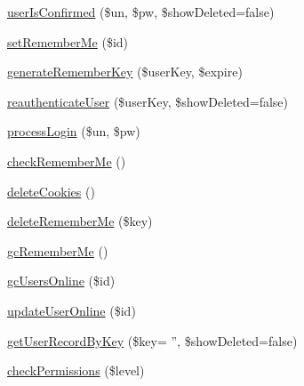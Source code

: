\begin{DoxyCompactItemize}
\item 
\hyperlink{classauth_a993edc9ce2684d94413789e743699f69}{user\-Is\-Confirmed} (\$un, \$pw, \$show\-Deleted=false)
\item 
\hyperlink{classauth_af52cf47d75b041a556ba0e81deb360b9}{set\-Remember\-Me} (\$id)
\item 
\hyperlink{classauth_a09c027ddb57e88464c0c299bcec2bbe9}{generate\-Remember\-Key} (\$user\-Key, \$expire)
\item 
\hyperlink{classauth_aad6c1472b13774bc969706be59e18e76}{reauthenticate\-User} (\$user\-Key, \$show\-Deleted=false)
\item 
\hyperlink{classauth_aba494ca171bd656b333cbb9ea412b05e}{process\-Login} (\$un, \$pw)
\item 
\hyperlink{classauth_a99dff94a4c66e53cb8aef3e5968a364f}{check\-Remember\-Me} ()
\item 
\hyperlink{classauth_a329bef105cd79e4930ce041851c46f8b}{delete\-Cookies} ()
\item 
\hyperlink{classauth_aa951d8fc2e1b0e0d399029c41c931a8f}{delete\-Remember\-Me} (\$key)
\item 
\hyperlink{classauth_afbd47d6b338ab27fb1fcc8adc53ddac0}{gc\-Remember\-Me} ()
\item 
\hyperlink{classauth_a3f53c431d5b15d03c6af6260b7ac8277}{gc\-Users\-Online} (\$id)
\item 
\hyperlink{classauth_ab177523369f165636ec3ffa8ba621d1f}{update\-User\-Online} (\$id)
\item 
\hyperlink{classauth_ac11efe54e164ac6f3fbe1ade310d8f4b}{get\-User\-Record\-By\-Key} (\$key= '', \$show\-Deleted=false)
\item 
\hyperlink{classauth_a2bd353b223eb32ee61aa1fede60971bb}{check\-Permissions} (\$level)
\end{DoxyCompactItemize}

